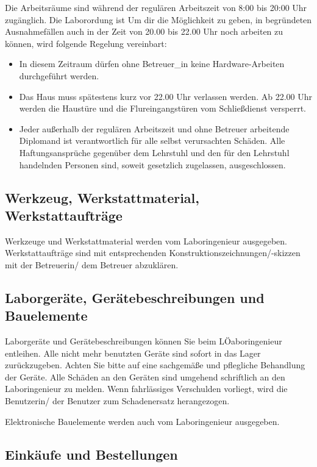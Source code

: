 Die Arbeitsräume sind während der regulären Arbeitszeit von 8:00 bis 20:00 Uhr zugänglich. Die Laborordung ist Um dir die Möglichkeit zu geben, in begründeten Ausnahmefällen auch in der Zeit von 20.00 bis 22.00 Uhr noch arbeiten zu können, wird folgende Regelung vereinbart:
\begin{itemize}
    \item In diesem Zeitraum dürfen ohne Betreuer\_in keine Hardware-Arbeiten durchgeführt werden.
    \item Das Haus muss spätestens kurz vor 22.00 Uhr verlassen werden. Ab 22.00 Uhr werden die Haustüre und die Flureingangstüren vom Schließdienst versperrt.
    \item Jeder außerhalb der regulären Arbeitszeit und ohne Betreuer arbeitende Diplomand ist verantwortlich für alle selbst verursachten Schäden. Alle Haftungsansprüche gegenüber dem  Lehrstuhl und den für den Lehrstuhl handelnden Personen sind, soweit gesetzlich zugelassen, ausgeschlossen.
\end{itemize}


\subsection{Werkzeug, Werkstattmaterial, Werkstattaufträge}

Werkzeuge und Werkstattmaterial werden vom Laboringenieur ausgegeben. Werkstattaufträge sind mit entsprechenden Konstruktionszeichnungen/-skizzen mit der Betreuerin/ dem Betreuer abzuklären.

\subsection{Laborgeräte, Gerätebeschreibungen und Bauelemente}

Laborgeräte und Gerätebeschreibungen können Sie beim LÖaboringenieur entleihen. 
Alle nicht mehr benutzten Geräte sind sofort in das Lager zurückzugeben. Achten Sie bitte auf eine sachgemäße und pflegliche Behandlung der Geräte. Alle Schäden an den Geräten sind umgehend schriftlich an den Laboringenieur zu melden. Wenn fahrlässiges Verschulden vorliegt, wird die Benutzerin/ der Benutzer zum Schadenersatz herangezogen.

Elektronische Bauelemente werden auch vom Laboringenieur ausgegeben.

\subsection{Einkäufe und Bestellungen}

